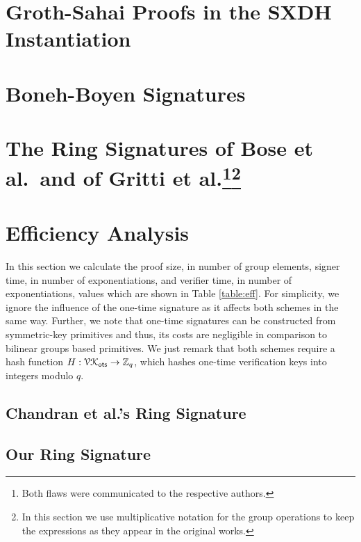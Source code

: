 \documentclass[a4paper,english]{lipics-v2016}
\begin{document}
		

	\section{Groth-Sahai Proofs in the SXDH Instantiation} \label{sec:gs-proofs}

		

	\section{Boneh-Boyen Signatures} \label{sec:bbs}
    
            

	 \section{The Ring Signatures of Bose et al.~and of Gritti et al.\protect\footnote{Both flaws were communicated to the respective authors.}\protect\footnote{In this section we use multiplicative notation for the group operations to keep the expressions as they appear in the original works.}}\label{sec:rs-flawed}
    
        	 

	\section{Efficiency Analysis}
		In this section we calculate the proof size, in number of group elements, signer time, in number of exponentiations, and verifier time, in number of exponentiations, values which are shown in Table \ref{table:eff}. For simplicity, we ignore the influence of the one-time signature as it affects both schemes in the same way. Further, we note that one-time signatures can be constructed from symmetric-key primitives and thus, its costs are negligible in comparison to bilinear groups based primitives. We just remark that both schemes require a hash function $H:\mathcal{VK}_{\mathsf{ots}}\to\mathbb{Z}_q$, which hashes one-time verification keys into integers modulo $q$.
		\subsection{Chandran et al.'s Ring Signature}
			
		\subsection{Our Ring Signature}
			
\end{document}
